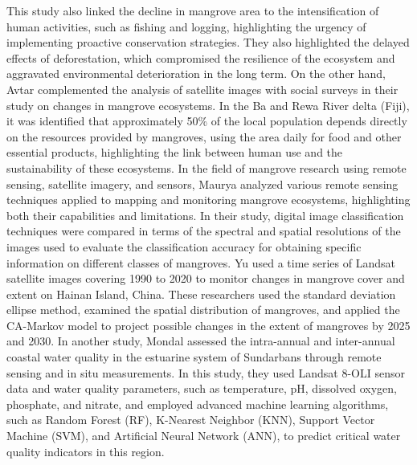 \documentclass[10pt,a4paper,twocolumn]{article}
\begin{document}
This study also linked the decline in mangrove area to the intensification of human activities, such as fishing and logging, highlighting the urgency of implementing proactive conservation strategies. They also highlighted the delayed effects of deforestation, which compromised the resilience of the ecosystem and aggravated environmental deterioration in the long term. On the other hand, Avtar \cite{avtar2021impacts} complemented the analysis of satellite images with social surveys in their study on changes in mangrove ecosystems. In the Ba and Rewa River delta (Fiji), it was identified that approximately 50\% of the local population depends directly on the resources provided by mangroves, using the area daily for food and other essential products, highlighting the link between human use and the sustainability of these ecosystems.
In the field of mangrove research using remote sensing, satellite imagery, and sensors, Maurya \cite{maurya2021remote} analyzed various remote sensing techniques applied to mapping and monitoring mangrove ecosystems, highlighting both their capabilities and limitations. In their study, digital image classification techniques were compared in terms of the spectral and spatial resolutions of the images used to evaluate the classification accuracy for obtaining specific information on different classes of mangroves. Yu \cite{yu2023using} used a time series of Landsat satellite images covering 1990 to 2020 to monitor changes in mangrove cover and extent on Hainan Island, China. These researchers used the standard deviation ellipse method, examined the spatial distribution of mangroves, and applied the CA-Markov model to project possible changes in the extent of mangroves by 2025 and 2030. In another study, Mondal \cite{mondal2024assessing} assessed the intra-annual and inter-annual coastal water quality in the estuarine system of Sundarbans through remote sensing and in situ measurements. In this study, they used Landsat 8-OLI sensor data and water quality parameters, such as temperature, pH, dissolved oxygen, phosphate, and nitrate, and employed advanced machine learning algorithms, such as Random Forest (RF), K-Nearest Neighbor (KNN), Support Vector Machine (SVM), and Artificial Neural Network (ANN), to predict critical water quality indicators in this region.
\end{document}

